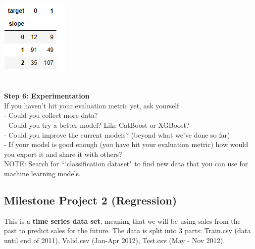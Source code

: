 \documentclass[11pt, a4paper]{article}
\begin{document}
\begin{spacing}{1.1}
\begin{minipage}[c]{8cm}
	\includegraphics[scale=.8]{crosstab2_mp}
	\end{minipage} \vspace*{7mm} \\
	\textbf{Step 6: Experimentation} \\
	If you haven't hit your evaluation metric yet, ask yourself: \vspace*{1mm} \\	
	\hspace*{2mm} - Could you collect more data? \\
	\hspace*{2mm} - Could you try a better model? Like CatBoost or XGBoost? \\
	\hspace*{2mm} - Could you improve the current models? (beyond what we've done so far) \\
	\hspace*{2mm} - If your model is good enough (you have hit your evaluation metric) how would you export it and \hspace*{5mm} share it with others? \vspace*{3mm} \\
	NOTE: Search for ```classification dataset" to find new data that you can use for machine learning models. \newpage

	\subsection{Milestone Project 2 (Regression)}
	This is a \textbf{time series data set}, meaning that we will be using sales from the past to predict sales for the future. The data is split into 3 parts: Train.csv (data until end of 2011), Valid.csv (Jan-Apr 2012), Test.csv (May - Nov 2012). \\~\\
	
	
	
	
	
	
	
	
	
	
	
	
	
	
		
	\end{spacing}
\end{document}
